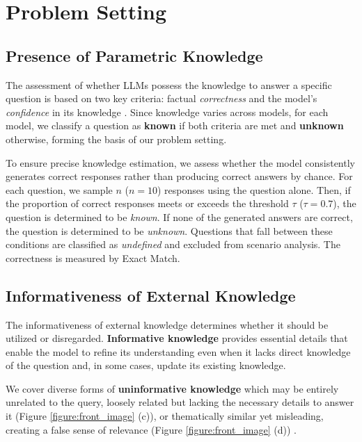\section{Problem Setting}

\subsection{Presence of Parametric Knowledge}
\label{dataset:parametric-knowledge}


The assessment of whether LLMs possess the knowledge to answer a specific question is based on two key criteria: factual \textit{correctness}  \citep{zhang-etal-2024-r, zhang-etal-2024-self, wang-etal-2024-factuality} and the model's \textit{confidence} in its knowledge \citep{kuhn2023semantic, 10820047, amayuelas-etal-2024-knowledge}.
Since knowledge varies across models, for each model, we classify a question as \textbf{known} if both criteria are met and \textbf{unknown} otherwise, forming the basis of our problem setting.


To ensure precise knowledge estimation, we assess whether the model consistently generates correct responses rather than producing correct answers by chance.
For each question, we sample $n$ ($n = 10$) responses using the question alone.
Then, if the proportion of correct responses meets or exceeds the threshold $\tau$ ($\tau = 0.7$), the question is determined to be \textit{known}.
If none of the generated answers are correct, the question is determined to be \textit{unknown}.
Questions that fall between these conditions are classified as \textit{undefined} and excluded from scenario analysis.
The correctness is measured by Exact Match.




\subsection{Informativeness of External Knowledge}
\label{section:externalKnowledge}


The informativeness of external knowledge determines whether it should be utilized or disregarded.
\textbf{Informative knowledge} provides essential details that enable the model to refine its understanding even when it lacks direct knowledge of the question and, in some cases, update its existing knowledge.


We cover diverse forms of \textbf{uninformative knowledge} which may be entirely unrelated to the query, loosely related but lacking the necessary details to answer it (Figure \ref{figure:front_image} (c)), or thematically similar yet misleading, creating a false sense of relevance (Figure \ref{figure:front_image} (d)) \citep{wu2024how}.


